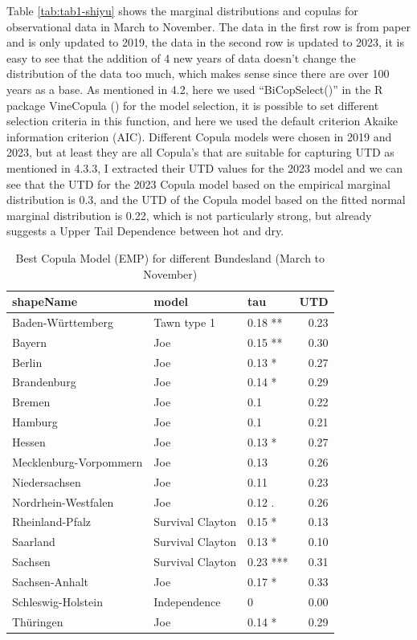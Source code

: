 \documentclass[
]{krantz}
\begin{document}
Table \ref{tab:tab1-shiyu} shows the marginal distributions and copulas for observational data in March to November. The data in the first row is from paper and is only updated to 2019, the data in the second row is updated to 2023, it is easy to see that the addition of 4 new years of data doesn't change the distribution of the data too much, which makes sense since there are over 100 years as a base. As mentioned in 4.2, here we used ``BiCopSelect()'' in the R package VineCopula (\citet{schepsmeier2018}) for the model selection, it is possible to set different selection criteria in this function, and here we used the default criterion Akaike information criterion (AIC). Different Copula models were chosen in 2019 and 2023, but at least they are all Copula's that are suitable for capturing UTD as mentioned in 4.3.3, I extracted their UTD values for the 2023 model and we can see that the UTD for the 2023 Copula model based on the empirical marginal distribution is 0.3, and the UTD of the Copula model based on the fitted normal marginal distribution is 0.22, which is not particularly strong, but already suggests a Upper Tail Dependence between hot and dry.

\begin{table}

\caption{\label{tab:tab2-shiyu}Best Copula Model (EMP) for different Bundesland (March to November)}
\centering
\begin{tabular}[t]{l|l|l|r}
\hline
shapeName & model & tau & UTD\\
\hline
Baden-Württemberg & Tawn type 1 & 0.18 ** & 0.23\\
\hline
Bayern & Joe & 0.15 ** & 0.30\\
\hline
Berlin & Joe & 0.13 * & 0.27\\
\hline
Brandenburg & Joe & 0.14 * & 0.29\\
\hline
Bremen & Joe & 0.1 & 0.22\\
\hline
Hamburg & Joe & 0.1 & 0.21\\
\hline
Hessen & Joe & 0.13 * & 0.27\\
\hline
Mecklenburg-Vorpommern & Joe & 0.13 & 0.26\\
\hline
Niedersachsen & Joe & 0.11 & 0.23\\
\hline
Nordrhein-Westfalen & Joe & 0.12 . & 0.26\\
\hline
Rheinland-Pfalz & Survival Clayton & 0.15 * & 0.13\\
\hline
Saarland & Survival Clayton & 0.13 * & 0.10\\
\hline
Sachsen & Survival Clayton & 0.23 *** & 0.31\\
\hline
Sachsen-Anhalt & Joe & 0.17 * & 0.33\\
\hline
Schleswig-Holstein & Independence & 0 & 0.00\\
\hline
Thüringen & Joe & 0.14 * & 0.29\\
\hline
\end{tabular}
\end{table}
\end{document}
